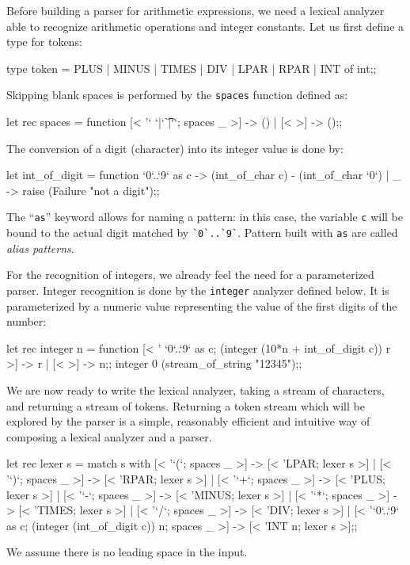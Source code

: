 Before building a parser for arithmetic expressions, we need a lexical
analyzer able to recognize arithmetic operations and integer
constants. Let us first define a type for tokens:
\begin{caml_example}
type token =
  PLUS | MINUS | TIMES | DIV | LPAR | RPAR
| INT of int;;
\end{caml_example}
Skipping blank spaces is performed by the {\tt spaces} function
defined as:
\begin{caml_example}
let rec spaces = function
  [< '` `|`\t`|`\n`; spaces _ >] -> ()
| [< >] -> ();;
\end{caml_example}
The conversion of a digit (character) into its integer value is done
by:
\begin{caml_example}
let int_of_digit = function
  `0`..`9` as c -> (int_of_char c) - (int_of_char `0`)
| _ -> raise (Failure "not a digit");;
\end{caml_example}
The ``{\tt as}'' keyword allows for naming a pattern: in this case,
the variable {\tt c} will be bound to the actual digit matched by
\verb|`0`..`9`|. Pattern built with {\tt as} are called {\em alias
patterns}.

For the recognition of integers, we already feel the need for a
parameterized parser. Integer recognition is done by the {\tt integer}
analyzer defined below. It is parameterized by a numeric value
representing the value of the first digits of the number:
\begin{caml_example}
let rec integer n = function
  [< ' `0`..`9` as c; (integer (10*n + int_of_digit c)) r >] -> r
| [< >] -> n;;
integer 0 (stream_of_string "12345");;
\end{caml_example}
We are now ready to write the lexical analyzer, taking a stream of
characters, and returning a stream of tokens. Returning a token stream
which will be explored by the parser is a simple, reasonably efficient
and intuitive way of composing a lexical analyzer and a parser.
\begin{caml_example}
let rec lexer s = match s with
  [< '`(`; spaces _ >] -> [< 'LPAR; lexer s >]
| [< '`)`; spaces _ >] -> [< 'RPAR; lexer s >]
| [< '`+`; spaces _ >] -> [< 'PLUS; lexer s >]
| [< '`-`; spaces _ >] -> [< 'MINUS; lexer s >]
| [< '`*`; spaces _ >] -> [< 'TIMES; lexer s >]
| [< '`/`; spaces _ >] -> [< 'DIV; lexer s >]
| [< '`0`..`9` as c; (integer (int_of_digit c)) n; spaces _ >]
                       -> [< 'INT n; lexer s >];;
\end{caml_example}
We assume there is no leading space in the input.

